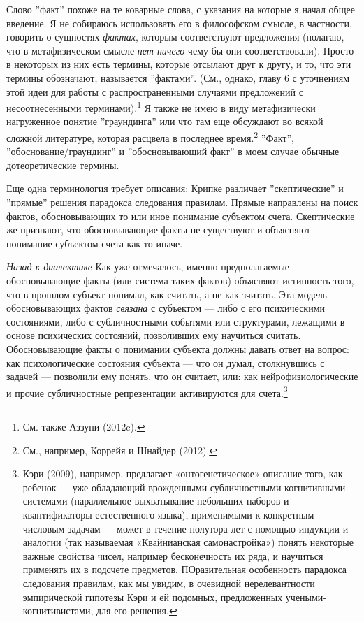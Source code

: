 \documentclass[12pt]{book}
\begin{document}
Слово ''факт'' похоже на те коварные слова, с указания на которые я начал общее введение. Я не собираюсь использовать его в философском смысле, в частности, говорить о сущностях-\textit{фактах}, которым соответствуют предложения (полагаю, что в метафизическом смысле \textit{нет ничего} чему бы они соответствовали). Просто в некоторых из них есть термины, которые отсылают друг к другу, и то, что эти термины обозначают, называется ''фактами''. (См., однако, главу 6 с уточнениям этой идеи для работы с распространенными случаями предложений с несоотнесенными терминами).\footnote{См. также Аззуни (2012c).} Я также не имею в виду метафизически нагруженное понятие ''граундинга'' или что там еще обсуждают во всякой сложной литературе, которая расцвела в последнее время.\footnote{См., например, Коррейя и Шнайдер (2012).} ''Факт'', ''обоснование/граундинг'' и ''обосновывающий факт'' в моем случае обычные дотеоретические термины.

Еще одна терминология требует описания: Крипке различает ''скептические'' и ''прямые'' решения парадокса следования правилам. Прямые направлены на поиск фактов, обосновывающих то или иное понимание субъектом счета. Скептические же признают, что обосновывающие факты не существуют и объясняют понимание субъектом счета как-то иначе.

\textit{Назад к диалектике} \quad Как уже отмечалось, именно предполагаемые обосновывающие факты (или система таких фактов) объясняют истинность того, что в прошлом субъект понимал, как считать, а не как зчитать. Эта модель обосновывающих фактов \textit{связана} с субъектом --- либо с его психическими состояниями, либо с субличностными событями или структурами, лежащими в основе психических состояний, позволивших ему научиться считать. Обосновывающие факты о понимании субъекта должны давать ответ на вопрос: как психологические состояния субъекта --- что он думал, столкнувшись с задачей --- позволили ему понять, что он считает, или: как нейрофизиологические и прочие субличностные репрезентации активируются для счета.\footnote{Кэри (2009), например, предлагает «онтогенетическое» описание того, как ребенок — уже обладающий врожденными субличностными когнитивными системами (параллельное выхватывание небольших наборов и квантификаторы естественного языка), применимыми к конкретным числовым задачам — может в течение полутора лет с помощью индукции и аналогии (так называемая «Квайнианская самонастройка») понять некоторые важные свойства чисел, например бесконечность их ряда, и научиться применять их в подсчете предметов. ПОразительная особенность парадокса следования правилам, как мы увидим, в очевидной нерелевантности эмпирической гипотезы Кэри и ей подомных, предложенных учеными-когнитивистами, для его решения.}
\end{document}
